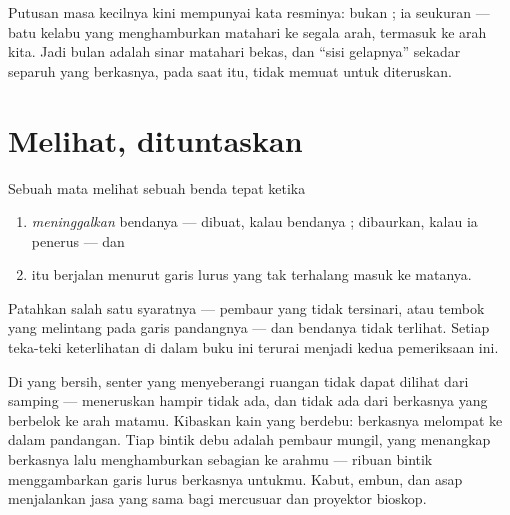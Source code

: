 \begin{example}\label{ex:g7:light-sources-propagation:moon}
Putusan masa kecilnya kini mempunyai kata resminya:  bukan ; ia  seukuran  --- batu kelabu yang
menghamburkan  matahari ke segala arah, termasuk ke arah kita.
Jadi  bulan adalah sinar matahari bekas, dan ``sisi gelapnya''
sekadar separuh yang berkasnya, pada saat itu, tidak memuat 
untuk diteruskan.
\end{example}

\section{Melihat, dituntaskan}

\begin{proposition}\label{prop:g7:light-sources-propagation:vision}
Sebuah mata melihat sebuah benda tepat ketika
\begin{enumerate}
  \item {} \emph{meninggalkan} bendanya --- dibuat, kalau
        bendanya ; dibaurkan, kalau ia penerus --- dan
  \item {} itu berjalan menurut garis lurus yang tak terhalang
        masuk ke matanya.
\end{enumerate}
Patahkan salah satu syaratnya --- pembaur yang tidak tersinari, atau
tembok yang melintang pada garis pandangnya --- dan bendanya tidak
terlihat. Setiap teka-teki keterlihatan di dalam buku ini terurai
menjadi kedua pemeriksaan ini.
\end{proposition}

\begin{example}\label{ex:g7:light-sources-propagation:beam}
Di  yang bersih,  senter yang menyeberangi ruangan tidak
dapat dilihat dari samping ---  meneruskan hampir tidak ada, dan
tidak ada  dari berkasnya yang berbelok ke arah matamu.
Kibaskan kain yang berdebu: berkasnya melompat ke dalam pandangan.
Tiap bintik debu adalah pembaur mungil, yang menangkap  berkasnya
lalu menghamburkan sebagian ke arahmu --- ribuan bintik menggambarkan
garis lurus berkasnya untukmu. Kabut, embun, dan asap menjalankan jasa
yang sama bagi  mercusuar dan proyektor bioskop.
\end{example}

